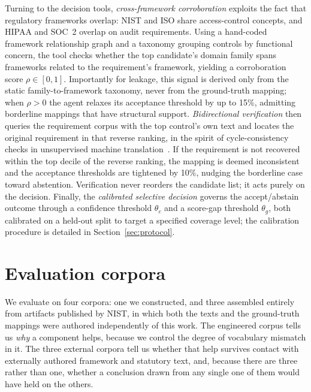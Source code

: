 \documentclass[smallextended,natbib]{svjour3}
\begin{document}
Turning to the decision tools, \emph{cross-framework corroboration} exploits the fact that regulatory frameworks overlap: NIST and ISO share access-control concepts, and HIPAA and SOC~2 overlap on audit requirements.
Using a hand-coded framework relationship graph and a taxonomy grouping controls by functional concern, the tool checks whether the top candidate's domain family spans frameworks related to the requirement's framework, yielding a corroboration score $\rho \in [0, 1]$.
Importantly for leakage, this signal is derived only from the static family-to-framework taxonomy, never from the ground-truth mapping; when $\rho > 0$ the agent relaxes its acceptance threshold by up to 15\%, admitting borderline mappings that have structural support.
\emph{Bidirectional verification} then queries the requirement corpus with the top control's own text and locates the original requirement in that reverse ranking, in the spirit of cycle-consistency checks in unsupervised machine translation~\citep{Lample2018}. If the requirement is not recovered within the top decile of the reverse ranking, the mapping is deemed inconsistent and the acceptance thresholds are tightened by 10\%, nudging the borderline case toward abstention. Verification never reorders the candidate list; it acts purely on the decision.
Finally, the \emph{calibrated selective decision} governs the accept/abstain outcome through a confidence threshold $\theta_c$ and a score-gap threshold $\theta_g$, both calibrated on a held-out split to target a specified coverage level; the calibration procedure is detailed in Section~\ref{sec:protocol}.


\section{Evaluation corpora}
\label{sec:dataset}

We evaluate on four corpora: one we constructed, and three assembled entirely from artifacts published by NIST, in which both the texts and the ground-truth mappings were authored independently of this work.
The engineered corpus tells us \emph{why} a component helps, because we control the degree of vocabulary mismatch in it.
The three external corpora tell us whether that help survives contact with externally authored framework and statutory text, and, because there are three rather than one, whether a conclusion drawn from any single one of them would have held on the others.
\end{document}
